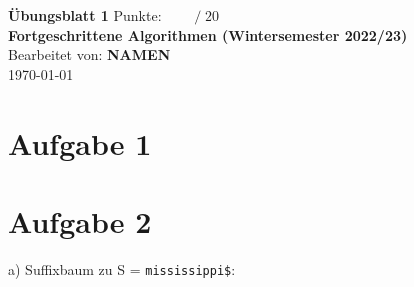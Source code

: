 \documentclass[a4paper]{scrartcl}
\def\sheetNumber{1}
\def\names{NAMEN}
\def\sumPoints{20}
\begin{document}
 

\begin{doublespace} %
\noindent \textbf{\LARGE{Übungsblatt \sheetNumber}}
\hfill  {\large Punkte: $\boxed{\qquad  /\; \sumPoints}$}\\
{\Large \textbf{Fortgeschrittene Algorithmen (Wintersemester 2022/23)}\\
Bearbeitet von: \textbf{\names}\\
\today}
\end{doublespace}


\section*{Aufgabe 1}
\newpage
\section*{Aufgabe 2}
a)
Suffixbaum zu S = \texttt{mississippi\$}:
\end{document}
